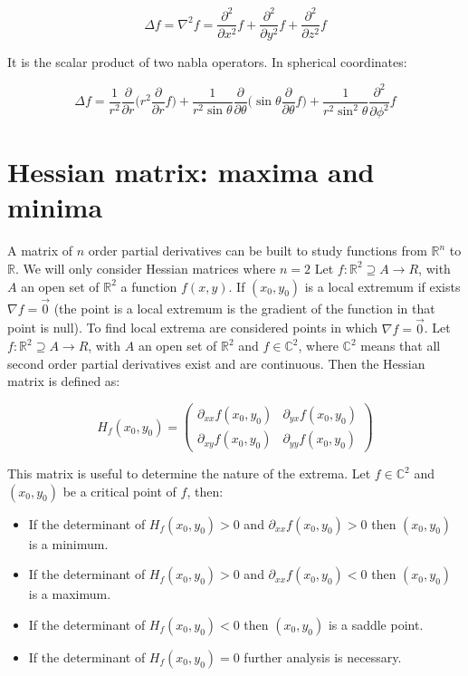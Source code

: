 	$$\Delta f = \nabla^2 f = \frac{\partial^2}{\partial x^2}f + \frac{\partial^2}{\partial y^2}f + \frac{\partial^2}{\partial z^2}f$$

	It is the scalar product of two nabla operators.
	In spherical coordinates:

	$$\Delta f = \frac{1}{r^2}\frac{\partial}{\partial r}\biggl(r^2\frac{\partial}{\partial r}f\biggr) + \frac{1}{r^2\sin\theta}\frac{\partial}{\partial\theta}\biggl(\sin\theta\frac{\partial}{\partial\theta}f\biggr) + \frac{1}{r^2\sin^2\theta}\frac{\partial^2}{\partial\phi^2}f$$

\section{Hessian matrix: maxima and minima}
A matrix of $n$ order partial derivatives can be built to study functions from $\mathbb{R}^n$ to $\mathbb{R}$. We will only consider Hessian matrices where $n = 2$
Let $f:\mathbb{R}^2\supseteq A\rightarrow{R}$, with $A$ an open set of $\mathbb{R}^2$ a function $f(x,y)$.
If $(x_0, y_0)$ is a local extremum if exists $\nabla f = \vec{0}$ (the point is a local extremum is the gradient of the function in that point is null).
To find local extrema are considered points in which $\nabla f = \vec{0}$.
Let $f:\mathbb{R}^2\supseteq A\rightarrow{R}$, with $A$ an open set of $\mathbb{R}^2$ and $f\in \mathbb{C}^2$, where $\mathbb{C}^2$ means that all second order partial derivatives exist and are continuous.
Then the Hessian matrix is defined as:

$$H_f(x_0, y_0) = \begin{pmatrix} \partial_{xx} f(x_0, y_0) & \partial_{yx}f(x_0, y_0) \\ \partial_{xy} f(x_0, y_0) & \partial_{yy}f(x_0, y_0)\end{pmatrix}$$

This matrix is useful to determine the nature of the extrema.
Let $f\in \mathbb{C}^2$ and $(x_0, y_0)$ be a critical point of $f$, then:

\begin{multicols}{2}
	\begin{itemize}
		\item If the determinant of $H_f(x_0, y_0) >0$ and $\partial_{xx}f(x_0, y_0) > 0$ then $(x_0, y_0)$ is a minimum.
		\item If the determinant of $H_f(x_0, y_0) >0$ and $\partial_{xx}f(x_0, y_0) < 0$ then $(x_0, y_0)$ is a maximum.
		\item If the determinant of $H_f(x_0, y_0)<0$ then $(x_0, y_0)$ is a saddle point.
		\item If the determinant of $H_f(x_0,y_0) = 0$ further analysis is necessary.
	\end{itemize}
\end{multicols}

